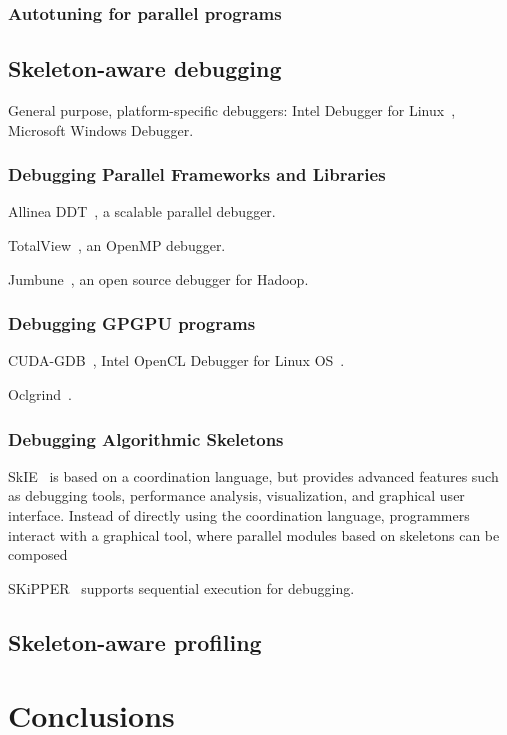 



\subsubsection{Autotuning for parallel programs}



\subsection{Skeleton-aware debugging}

General purpose, platform-specific debuggers: Intel Debugger for
Linux~\cite{Blair-chappell}, Microsoft Windows Debugger.


\subsubsection{Debugging Parallel Frameworks and Libraries}

Allinea DDT~\cite{K2010}, a scalable parallel debugger.

TotalView~\cite{Cownie2000}, an OpenMP debugger.

Jumbune~\cite{ImpetusTechnologies}, an open source debugger for
Hadoop.


\subsubsection{Debugging GPGPU programs}

CUDA-GDB~\cite{NVIDIA2016}, Intel OpenCL Debugger for Linux
OS~\cite{IntelCorporation2016}.

Oclgrind~\cite{Price2015}.


\subsubsection{Debugging Algorithmic Skeletons}

SkIE~\cite{Bacci1999} is based on a coordination language, but
provides advanced features such as debugging tools, performance
analysis, visualization, and graphical user interface. Instead of
directly using the coordination language, programmers interact with a
graphical tool, where parallel modules based on skeletons can be
composed

SKiPPER~\cite{Cezeaux1999} supports sequential execution for
debugging.


\subsection{Skeleton-aware profiling}



\section{Conclusions}


\label{bibliography}
\printbibliography



